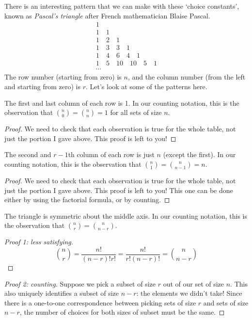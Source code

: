 There is an interesting pattern that we can make with these `choice constants', known as \emph{Pascal's triangle} after
French mathematician Blaise Pascal.
\begin{gather*}
  1\\
  1 \quad 1\\
  1 \quad 2 \quad 1\\
  1 \quad 3 \quad 3 \quad 1\\
  1 \quad 4 \quad 6 \quad 4 \quad 1\\
  1 \quad 5 \quad 10 \quad 10 \quad 5 \quad 1\\
  \cdots
\end{gather*}
The row number (starting from zero) is $ n $, and the column number (from the left and starting from zero) is $ r $. Let's look at some of the patterns here.
\begin{obs}
  The first and last column of each row is 1. In our counting notation, this is the observation that $ \binom{n}{0} = \binom{n}{n} = 1 $
  for all sets of size $ n $.
\end{obs}
\begin{proof}
  We need to check that each observation is true for the whole table, not just the portion I gave above. This proof is left
  to you!
\end{proof}

\begin{obs}
  The second and $ r - 1$th column of each row is just $ n $ (except the first). In our counting notation, this is the observation
  that $ \binom{n}{1} = \binom{n}{n - 1} = n $.
\end{obs}
\begin{proof}
  We need to check that each observation is true for the whole table, not just the portion I gave above. This proof is left
  to you! This one can be done either by using the factorial formula, or by counting.
\end{proof}

\begin{obs}
  The triangle is symmetric about the middle axis. In our counting notation, this is the observation that $ \binom{n}{r} = \binom{n}{n - r} $.
\end{obs}
\begin{proof}[Proof 1: less satisfying]
  \begin{displaymath}
    \binom{n}{r} = \frac{n!}{(n - r)!r!} = \frac{n!}{r!(n - r)!} = \binom{n}{n - r}
  \end{displaymath}
\end{proof}
\begin{proof}[Proof 2: counting]
  Suppose we pick a subset of size $ r $ out of our set of size $ n $. This also uniquely identifies
  a subset of size $ n - r $: the elements we didn't take! Since there is a one-to-one correspondence
  between picking sets of size $ r $ and sets of size $ n - r $, the number of choices for both sizes
  of subset must be the same.
\end{proof}

